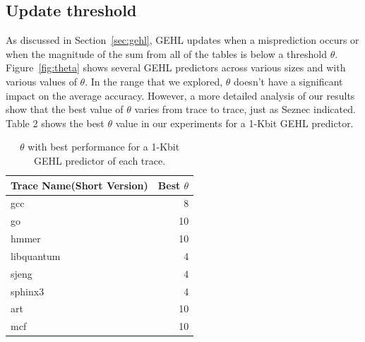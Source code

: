 \subsection{Update threshold}
As discussed in Section~\ref{sec:gehl}, GEHL updates when a misprediction occurs or when the magnitude of the sum from all of the tables is below a threshold $\theta$.  Figure~\ref{fig:theta} shows several GEHL predictors across various sizes and with various values of $\theta$.  In the range that we explored, $\theta$ doesn't have a significant impact on the average accuracy.  However, a more detailed analysis of our results show that the best value of $\theta$ varies from trace to trace, just as Seznec indicated. Table 2 shows the best $\theta$ value in our experiments for a 1-Kbit GEHL predictor.
\begin{table}
  \centering
  \begin{tabular}{l|r}
    Trace Name(Short Version) & Best $\theta$ \\ \hline
    gcc & 8 \\
    go &  10 \\
    hmmer &10 \\
    libquantum & 4\\
    sjeng  & 4\\
    sphinx3  &4 \\
    art  &10\\
    mcf  & 10\\
 \end{tabular}
 \caption{$\theta$ with best performance for a 1-Kbit GEHL predictor of each trace.}
 \label{table:bestTheta}
\end{table}
